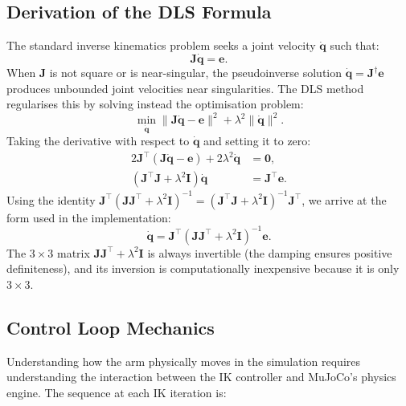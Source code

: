 \documentclass[11pt,a4paper]{report}
\begin{document}
\subsection{Derivation of the DLS Formula}

The standard inverse kinematics problem seeks a joint velocity $\dot{\mathbf{q}}$ such that:
\begin{equation}
  \mathbf{J} \dot{\mathbf{q}} = \mathbf{e}.
\end{equation}
When $\mathbf{J}$ is not square or is near-singular, the pseudoinverse solution $\dot{\mathbf{q}} = \mathbf{J}^{\dagger} \mathbf{e}$ produces unbounded joint velocities near singularities. The DLS method regularises this by solving instead the optimisation problem:
\begin{equation}
  \min_{\dot{\mathbf{q}}} \|\mathbf{J} \dot{\mathbf{q}} - \mathbf{e}\|^2
  + \lambda^2 \|\dot{\mathbf{q}}\|^2.
\end{equation}
Taking the derivative with respect to $\dot{\mathbf{q}}$ and setting it to zero:
\begin{align}
  2 \mathbf{J}^{\top}(\mathbf{J} \dot{\mathbf{q}} - \mathbf{e})
  + 2\lambda^2 \dot{\mathbf{q}} &= \mathbf{0}, \nonumber \\
  (\mathbf{J}^{\top}\mathbf{J} + \lambda^2 \mathbf{I}) \dot{\mathbf{q}}
  &= \mathbf{J}^{\top} \mathbf{e}.
\end{align}
Using the identity $\mathbf{J}^{\top}(\mathbf{J}\mathbf{J}^{\top} + \lambda^2\mathbf{I})^{-1} = (\mathbf{J}^{\top}\mathbf{J} + \lambda^2\mathbf{I})^{-1}\mathbf{J}^{\top}$, we arrive at the form used in the implementation:
\begin{equation}
  \dot{\mathbf{q}} = \mathbf{J}^{\top}
    (\mathbf{J}\mathbf{J}^{\top} + \lambda^2\mathbf{I})^{-1} \mathbf{e}.
\end{equation}
The $3 \times 3$ matrix $\mathbf{J}\mathbf{J}^{\top} + \lambda^2\mathbf{I}$ is always invertible (the damping ensures positive definiteness), and its inversion is computationally inexpensive because it is only $3 \times 3$.

\subsection{Control Loop Mechanics}
\label{sec:control_loop}

Understanding how the arm physically moves in the simulation requires understanding the interaction between the IK controller and MuJoCo's physics engine. The sequence at each IK iteration is:
\end{document}
